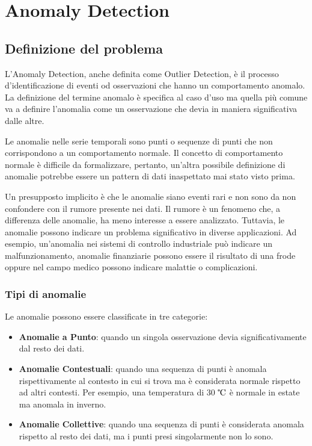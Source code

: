 \chapter{Anomaly Detection}
\label{chap:intro}

\section{Definizione del problema}

L'Anomaly Detection, anche definita come Outlier Detection, è il processo d'identificazione di eventi od osservazioni che hanno un comportamento anomalo. 
La definizione del termine anomalo è specifica al caso d'uso ma quella più comune va a definire l'anomalia come un osservazione che devia in maniera significativa dalle altre.

Le anomalie nelle serie temporali sono punti o sequenze di punti che non corrispondono a un comportamento normale. Il concetto di comportamento normale è difficile da formalizzare, pertanto, un'altra possibile definizione di anomalie potrebbe essere un pattern di dati inaspettato mai stato visto prima.

Un presupposto implicito è che le anomalie siano eventi rari e non sono da non confondere con il rumore presente nei dati. Il rumore è un fenomeno che, a differenza delle anomalie, ha meno interesse a essere analizzato.
Tuttavia, le anomalie possono indicare un problema significativo in diverse applicazioni. Ad esempio, un'anomalia nei sistemi di controllo industriale può indicare un malfunzionamento, anomalie finanziarie possono essere il risultato di una frode oppure nel campo medico possono indicare malattie o complicazioni.

\subsection{Tipi di anomalie}
Le anomalie possono essere classificate in tre categorie:
\begin{itemize}
	\item \textbf{Anomalie a Punto}: quando un singola osservazione devia significativamente dal resto dei dati.
	\item \textbf{Anomalie Contestuali}: quando una sequenza di punti è anomala rispettivamente al contesto in cui si trova ma è considerata normale rispetto ad altri contesti. Per esempio, una temperatura di 30 $\tccentigrade$ è normale in estate ma anomala in inverno. 
	\item \textbf{Anomalie Collettive}: quando una sequenza di punti è considerata anomala rispetto al resto dei dati, ma i punti presi singolarmente non lo sono.
\end{itemize}


